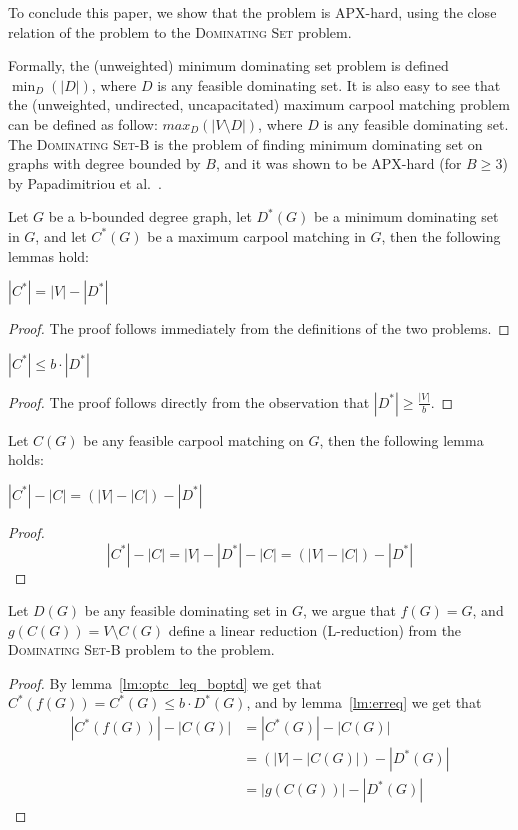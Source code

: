 \label{sec:hardness}
To conclude this paper, we show that the \textsc{\CARPOOL{}} problem is APX-hard,
using the close relation of the problem to the \textsc{Dominating Set} problem.

Formally, the (unweighted) minimum dominating set problem is defined
$\min_{D}(|D|)$,
where $D$ is any feasible dominating set.
It is also easy to see that the (unweighted, undirected, uncapacitated) 
maximum carpool matching problem can be defined as follow: 
$max_{D}(|V \setminus D|)$, 
where $D$ is any feasible dominating set.
The \textsc{Dominating Set-B} is the problem of finding minimum dominating set on 
graphs with degree bounded by $B$,
and it was shown to be APX-hard (for $B \geq 3$) by 
Papadimitriou et al.~\cite{papadimitriou1988optimization}.

Let $G$ be a b-bounded degree graph,
let $D^*(G)$ be a minimum dominating set in $G$,
and let $C^*(G)$ be a maximum carpool matching in $G$, 
then the following lemmas hold:

\begin{lemma}
$|C^*| = |V| - |D^*|$
\end{lemma}

\begin{proof}
The proof follows immediately from the definitions of the two problems. 
\end{proof}

\begin{lemma}
\label{lm:optc_leq_boptd}
$|C^*| \leq b \cdot |D^*|$
\end{lemma}

\begin{proof}
The proof follows directly from the observation that $|D^*| \geq \frac{|V|}{b}$.
\end{proof}

Let $C(G)$ be any feasible carpool matching on $G$, then the following lemma holds:

\begin{lemma}
\label{lm:erreq}
$|C^*| - |C| = (|V| - |C|) - |D^*|$
\end{lemma}

\begin{proof}
$$
|C^*| - |C| 				= 
|V| - |D^*| - |C| 	= 
(|V| - |C|) - |D^*|
$$
\end{proof}

Let $D(G)$ be any feasible dominating set in $G$, 
we argue that $f(G) = G$, and $g(C(G)) = V \setminus C(G)$ 
define a linear reduction (L-reduction) from the \textsc{Dominating Set-B} problem to the 
\textsc{\CARPOOL{}} problem.
\begin{proof}
By lemma~\ref{lm:optc_leq_boptd} we get that $C^*(f(G)) = C^*(G) \leq b \cdot D^*(G)$,
and by lemma~\ref{lm:erreq} we get that 
\begin{equation}
\begin{split}
|C^*(f(G))| - |C(G)|		& = |C^*(G)| - |C(G)| 			\\
							& = (|V| - |C(G)|) - |D^*(G)|	\\
							& = |g(C(G))| - |D^*(G)|
\end{split}
\end{equation}
\end{proof}

